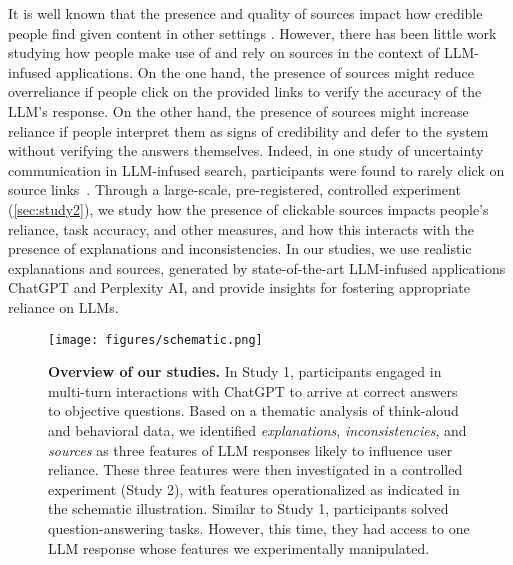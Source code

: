 It is well known that the presence and quality of sources impact how credible people find given content in other settings \cite{Rieh2007Credibility,Wathen2002Credibility}. However, there has been little work studying how people make use of and rely on sources in the context of LLM-infused applications. On the one hand, the presence of sources might reduce overreliance if people click on the provided links to verify the accuracy of the LLM's response. On the other hand, the presence of sources might increase reliance if people interpret them as signs of credibility and defer to the system without verifying the answers themselves. Indeed, in one study of uncertainty communication in LLM-infused search, participants were found to rarely click on source links~\cite{Kim2024FAccT}. Through a large-scale, pre-registered, controlled experiment (\cref{sec:study2}), we study how the presence of clickable sources impacts people's reliance, task accuracy, and other measures, and how this interacts with the presence of explanations and inconsistencies. In our studies, we use realistic explanations and sources, generated by state-of-the-art LLM-infused applications ChatGPT and Perplexity AI, and provide insights for fostering appropriate reliance on LLMs. 



\begin{figure*}[t!]
\centering
\texttt{[image: figures/schematic.png]}
\caption{\textbf{Overview of our studies.} In Study 1, participants engaged in multi-turn interactions with ChatGPT to arrive at correct answers to objective questions. Based on a thematic analysis of think-aloud and behavioral data, we identified \textit{explanations}, \textit{inconsistencies}, and \textit{sources} as three features of LLM responses likely to influence user reliance. These three features were then investigated in a controlled experiment (Study 2), with features operationalized as indicated in the schematic illustration. Similar to Study 1, participants solved question-answering tasks. However, this time, they had access to one LLM response whose features we experimentally manipulated.}
\label{fig:schematic}
\end{figure*}